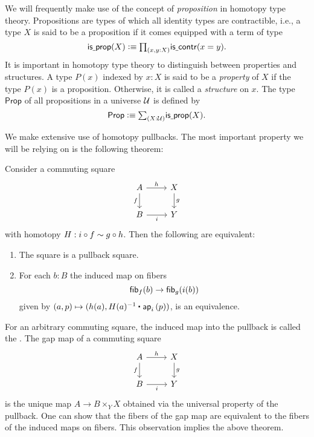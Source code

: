 \documentclass[9pt,twosided]{amsart}
\begin{document}
We will frequently make use of the concept of \emph{proposition} in homotopy type theory. Propositions are types of which all identity types are contractible, i.e., a type $X$ is said to be a proposition if it comes equipped with a term of type
\begin{equation*}
  \isprop(X)\defeq\prd{x,y:X}\iscontr(x=y).
\end{equation*}
It is important in homotopy type theory to distinguish between properties and structures. A type $P(x)$ indexed by $x:X$ is said to be a \emph{property} of $X$ if the type $P(x)$ is a proposition. Otherwise, it is called a \emph{structure} on $x$. The type $\mathsf{Prop}$ of all propositions in a universe $\mathcal{U}$ is defined by
\begin{equation*}
  \mathsf{Prop}\defeq \sm{X:\UU}\isprop(X).
\end{equation*}

We make extensive use of homotopy pullbacks. The most important property we will be relying on is the following theorem:

\begin{thm}\label{thm:pullback}
  Consider a commuting square
  \begin{equation*}
    \begin{tikzcd}
      A \arrow[r,"h"] \arrow[d,swap,"f"] & X \arrow[d,"g"] \\
      B \arrow[r,swap,"i"] & Y
    \end{tikzcd}
  \end{equation*}
  with homotopy $H:i\circ f\sim g\circ h$. Then the following are equivalent:
  \begin{enumerate}
  \item The square is a pullback square.
  \item For each $b:B$ the induced map on fibers
    \begin{equation*}
      \fib{f}{b} \to \fib{g}{i(b)}
    \end{equation*}
    given by $(a,p)\mapsto (h(a),\ct{H(a)^{-1}}{\ap{i}{p}})$, is an equivalence.
  \end{enumerate}
\end{thm}

For an arbitrary commuting square, the induced map into the pullback is called the . The gap map of a commuting square
  \begin{equation*}
    \begin{tikzcd}
      A \arrow[r,"h"] \arrow[d,swap,"f"] & X \arrow[d,"g"] \\
      B \arrow[r,swap,"i"] & Y
    \end{tikzcd}
  \end{equation*}
is the unique map $A\to B\times_Y X$ obtained via the universal property of the pullback. One can show that the fibers of the gap map are equivalent to the fibers of the induced maps on fibers. This observation implies the above theorem.
\end{document}
